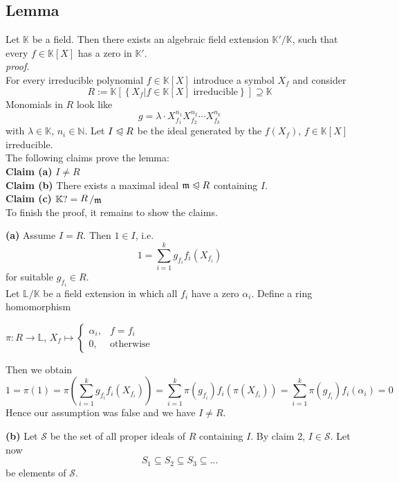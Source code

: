 \documentclass[12pt]{book}
\newcommand{\slant}[2]{{\raisebox{.1em}{$#1$}\left/\raisebox{-.1em}{$#2$}\right.}}
\begin{document}
\begin{spacing}{1.3}
\subsection{Lemma} %
Let $\mathbb{K}$ be a field.
Then there exists an algebraic field extension $\mathbb{K}'/\mathbb{K}$, such that every $f \in \mathbb{K}[X]$ has a zero in $\mathbb{K}'$.\\
\textit{proof.}\\
For every irreducible polynomial $f \in \mathbb{K}[X]$ introduce a symbol $X_f$ and consider
$$R:=\mathbb{K}[ \left\{X_f \big \vert  f \in \mathbb{K}[X] \textrm{ irreducible}\right\}] \supseteq \mathbb{K}$$
Monomials in $R$ look like $$g=\lambda \cdot X_{f_1}^{n_1}X_{f_2}^{n_2}\cdots X_{f_k}^{n_k}$$ with $\lambda \in \mathbb{K}$, $n_i \in \mathbb{N}$.
Let $I \trianglelefteqslant R$ be the ideal generated by the $f(X_f)$, $f \in \mathbb{K}[X]$ irreducible.\\
The following claims prove the lemma:\\
\textbf{Claim (a)} $I \neq R$\\
\textbf{Claim (b)} There exists a maximal ideal $\mathfrak{m} \trianglelefteqslant R$ containing $I$.\\
\textbf{Claim (c)} $\mathbb{K}?=\slant{R}{\mathfrak{m}}$\\
To finish the proof, it remains to show the claims.
\begin{compactenum}
\item[\textbf{(a)}] Assume $I=R$. Then $1 \in  I$, i.e. $$1= \sum_{i=1}^k g_{f_i} f_i\left(X_{f_i}\right)$$ for suitable $g_{f_i} \in R$.\\
Let $\mathbb{L}/\mathbb{K}$ be a field extension in which all $f_i$ have a zero $\alpha_i$. Define a ring homomorphism
\begin{center} $\pi: R \longrightarrow \mathbb{L}$, $X_f \mapsto \begin{cases} \alpha_i, & f=f_i \\ 0, & \textrm{otherwise} \end{cases}$\end{center}
Then we obtain
$$1=\pi(1)= \pi \left(\sum_{i=1}^k g_{f_i} f_i\left(X_{f_i}\right)\right)=\sum_{i=1}^k \pi(g_{f_i}) f_i \left(\pi(X_{f_i})\right)=\sum_{i=1}^k \pi(g_{f_i}) f_i \left(\alpha_i\right)=0$$
Hence our assumption was false and we have $I \neq R$.
\item[\textbf{(b)}] Let $\mathcal{S}$ be the set of all proper ideals of $R$ containing $I$. By claim 2, $I \in \mathcal{S}$.
Let now $$S_1 \subseteq S_2 \subseteq S_3 \subseteq \dots$$ be elements of $\mathcal{S}$.

\end{compactenum}
\end{spacing}
\end{document}
